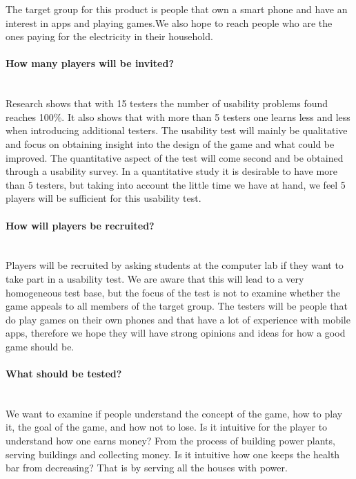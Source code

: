 		The target group for this product is people that own a smart phone and have an interest in apps and playing games.We also hope to reach people who are the ones paying for the electricity in their household. 

	\paragraph{How many players will be invited?}\mbox{}\\

		Research shows that with 15 testers the number of usability problems found reaches 100\%. \cite{numberOfUsers} It also shows that with more than 5 testers one learns less and less when introducing additional testers. The usability test will mainly be qualitative and focus on obtaining insight into the design of the game and what could be improved. The quantitative aspect of the test will come second and be obtained through a usability survey. In a quantitative study it is desirable to have more than 5 testers, but taking into account the little time we have at hand, we feel 5 players will be sufficient for this usability test.

	\paragraph{How will players be recruited?}\mbox{}\\

		Players will be recruited by asking students at the computer lab if they want to take part in a usability test. We are aware that this will lead to a very homogeneous test base, but the focus of the test is not to examine whether the game appeals to all members of the target group. The testers will be people that do play games on their own phones and that have a lot of experience with mobile apps, therefore we hope they will have strong opinions and ideas for how a good game should be.

	\paragraph{What should be tested?}\mbox{}\\

		We want to examine if people understand the concept of the game, how to play it, the goal of the game, 
		and how not to lose. Is it intuitive for the player to understand how one earns money? From the process 
		of building power plants, serving buildings and collecting money. Is it intuitive how one keeps 
		the health bar from decreasing? That is by serving all the houses with power.

